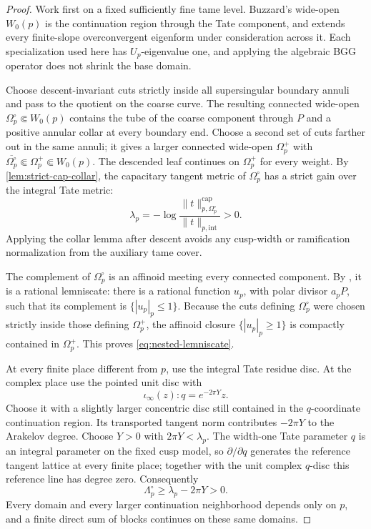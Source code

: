 \documentclass[11pt]{article}
\theoremstyle{definition}
\theoremstyle{remark}
\begin{document}
\begin{proof}
Work first on a fixed sufficiently fine tame level.  Buzzard's wide-open
$W_0(p)$ is the continuation region through the Tate component, and
\cite[Theorem~5.2]{Buzzard2003} extends every finite-slope overconvergent
eigenform under consideration across it.  Each specialization used here has
$U_p$-eigenvalue one, and applying the algebraic BGG operator does not shrink
the base domain.

Choose descent-invariant cuts strictly inside all supersingular boundary
annuli and pass to the quotient on the coarse curve.  The resulting connected
wide-open $\Omega_p^\circ\Subset W_0(p)$ contains the tube of the coarse
component through $P$ and a positive annular collar at every boundary end.
Choose a second set of cuts farther out in the same annuli; it gives a larger
connected wide-open $\Omega_p^+$ with
$\overline{\Omega_p^\circ}\Subset\Omega_p^+\Subset W_0(p)$.  The descended
leaf continues on $\Omega_p^+$ for every weight.  By
\cref{lem:strict-cap-collar}, the capacitary tangent metric of
$\Omega_p^\circ$ has a strict gain over the integral Tate metric:
\[
 \lambda_p=-\log
 \frac{\|t\|_{p,\Omega_p^\circ}^{\mathrm{cap}}}
      {\|t\|_{p,\mathrm{int}}}>0.
\]
Applying the collar lemma after descent avoids any cusp-width or ramification
normalization from the auxiliary tame cover.

The complement of $\Omega_p^\circ$ is an affinoid meeting every connected
component.  By \cite[Proposition~5.6]{BostChambertLoir2009}, it is a rational
lemniscate: there is a rational function $u_p$, with polar divisor $a_pP$,
such that its complement is $\{|u_p|_p\le1\}$.  Because the cuts defining
$\Omega_p^\circ$ were chosen strictly inside those defining $\Omega_p^+$,
the affinoid closure $\{|u_p|_p\ge1\}$ is compactly contained in
$\Omega_p^+$.  This proves \eqref{eq:nested-lemniscate}.

At every finite place different from $p$, use the integral Tate residue disc.
At the complex place use the pointed unit disc with
\[
 \iota_\infty(z):q=e^{-2\pi Y}z.
\]
Choose it with a slightly larger concentric disc still contained in the
$q$-coordinate continuation region.  Its transported tangent norm contributes
$-2\pi Y$ to the Arakelov degree.  Choose $Y>0$ with
$2\pi Y<\lambda_p$.  The width-one Tate parameter $q$ is an integral
parameter on the fixed cusp model, so $\partial/\partial q$ generates the
reference tangent lattice at every finite place; together with the unit
complex $q$-disc this reference line has degree zero.  Consequently
\[
 \Lambda_p^\circ\ge\lambda_p-2\pi Y>0.
\]
Every domain and every larger continuation neighborhood depends only on $p$,
and a finite direct sum of blocks continues on these same domains.
\end{proof}
\end{document}
